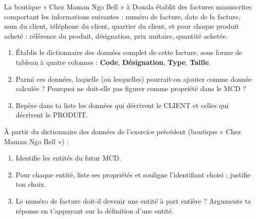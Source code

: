 \documentclass[11pt]{article}
\newcounter{popsec}
\newcounter{popsub}
\newcommand{\courssub}[1]{%
  \stepcounter{popsub}%
  \par\vspace{9pt}\noindent{\popxbold\fontsize{11.5}{13}\selectfont\color{popink}{\color{poporange}\thepopsec.\thepopsub}\hspace{6pt}#1}\par\nopagebreak\vspace{4pt}
}
\begin{document}
\courssub{Je m'entraîne}

\begin{exercice}
La boutique « Chez Maman Ngo Bell » à Douala établit des factures manuscrites comportant les informations suivantes : numéro de facture, date de la facture, nom du client, téléphone du client, quartier du client, et pour chaque produit acheté : référence du produit, désignation, prix unitaire, quantité achetée.
\begin{enumerate}
\item Établis le dictionnaire des données complet de cette facture, sous forme de tableau à quatre colonnes : \textbf{Code}, \textbf{Désignation}, \textbf{Type}, \textbf{Taille}.
\item Parmi ces données, laquelle (ou lesquelles) pourrait-on ajouter comme donnée calculée ? Pourquoi ne doit-elle pas figurer comme propriété dans le MCD ?
\item Repère dans ta liste les données qui décrivent le CLIENT et celles qui décrivent le PRODUIT.
\end{enumerate}
\end{exercice}

\begin{exercice}
À partir du dictionnaire des données de l'exercice précédent (boutique « Chez Maman Ngo Bell ») :
\begin{enumerate}
\item Identifie les entités du futur MCD.
\item Pour chaque entité, liste ses propriétés et souligne l'identifiant choisi ; justifie ton choix.
\item Le numéro de facture doit-il devenir une entité à part entière ? Argumente ta réponse en t'appuyant sur la définition d'une entité.
\end{enumerate}
\end{exercice}
\end{document}
